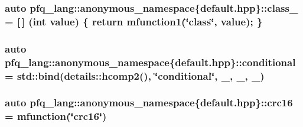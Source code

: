 \hypertarget{namespacepfq__lang_1_1anonymous__namespace_02default_8hpp_03_a27a683ef93570a66844e1a0106e6336a}{
\subsubsection[{class\+\_\+}]{\setlength{\rightskip}{0pt plus 5cm}auto pfq\+\_\+lang\+::anonymous\+\_\+namespace\{default.\+hpp\}\+::class\+\_\+ = \mbox{[}$\,$\mbox{]} (int value) \{ return {\bf mfunction1}(\char`\"{}class\char`\"{}, value); \}}}\label{namespacepfq__lang_1_1anonymous__namespace_02default_8hpp_03_a27a683ef93570a66844e1a0106e6336a}
\hypertarget{namespacepfq__lang_1_1anonymous__namespace_02default_8hpp_03_a022d0075edf2fff575b93377aec0c228}{
\subsubsection[{conditional}]{\setlength{\rightskip}{0pt plus 5cm}auto pfq\+\_\+lang\+::anonymous\+\_\+namespace\{default.\+hpp\}\+::conditional = std\+::bind(details\+::hcomp2(), \char`\"{}conditional\char`\"{}, \+\_, \+\_, \+\_)}}\label{namespacepfq__lang_1_1anonymous__namespace_02default_8hpp_03_a022d0075edf2fff575b93377aec0c228}
\hypertarget{namespacepfq__lang_1_1anonymous__namespace_02default_8hpp_03_aaa12e1daf6bd2719a3b8592e673acf84}{
\subsubsection[{crc16}]{\setlength{\rightskip}{0pt plus 5cm}auto pfq\+\_\+lang\+::anonymous\+\_\+namespace\{default.\+hpp\}\+::crc16 = {\bf mfunction}(\char`\"{}crc16\char`\"{})}}\label{namespacepfq__lang_1_1anonymous__namespace_02default_8hpp_03_aaa12e1daf6bd2719a3b8592e673acf84}
